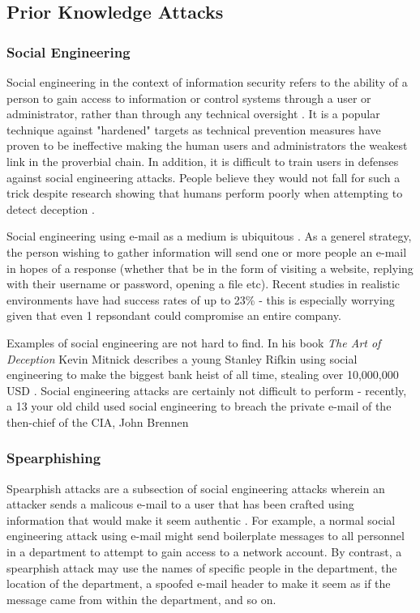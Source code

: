 \documentclass[12pt]{article}
\begin{document}
\subsection{Prior Knowledge Attacks}
\subsubsection{Social Engineering}
Social engineering in the context of information security refers to the ability of a person to gain access to information or control systems through a user or administrator, rather than through any technical oversight \citep{socialengineeringvulnerabilites}. It is a popular technique against "hardened" targets as technical prevention measures have proven to be ineffective \citep{advancedsocialengineering} making the human users and administrators the weakest link in the proverbial chain. In addition, it is difficult to train users in defenses against social engineering attacks. People believe they would not fall for such a trick despite research showing that humans perform poorly when attempting to detect deception \citep{advancedsocialengineering}\citep{socialengineeringvulnerabilites}. 

Social engineering using e-mail as a medium is ubiquitous \citep{socialengineeringvulnerabilites}. As a generel strategy, the person wishing to gather information will send one or more people an e-mail in hopes of a response (whether that be in the form of visiting a website, replying with their username or password, opening a file etc). Recent studies in realistic environments have had success rates of up to 23\% \citep{socialengineeringvulnerabilites} - this is especially worrying given that even 1 repsondant could compromise an entire company.

Examples of social engineering are not hard to find. In his book \textit{The Art of Deception} Kevin Mitnick describes a young Stanley Rifkin using social engineering to make the biggest bank heist of all time, stealing over 10,000,000 USD \citep{mitnick}. Social engineering attacks are certainly not difficult to perform - recently, a 13 your old child used social engineering to breach the private e-mail of the then-chief of the CIA, John Brennen \citep{cia13yearold}

\subsubsection{Spearphishing}
Spearphish attacks are a subsection of social engineering attacks wherein an attacker sends a malicous e-mail to a user that has been crafted using information that would make it seem authentic \citep{spearphishing}. For example, a normal social engineering attack using e-mail might send boilerplate messages to all personnel in a department to attempt to gain access to a network account. By contrast, a spearphish attack may use the names of specific people in the department, the location of the department, a spoofed e-mail header to make it seem as if the message came from within the department, and so on.
\end{document}
